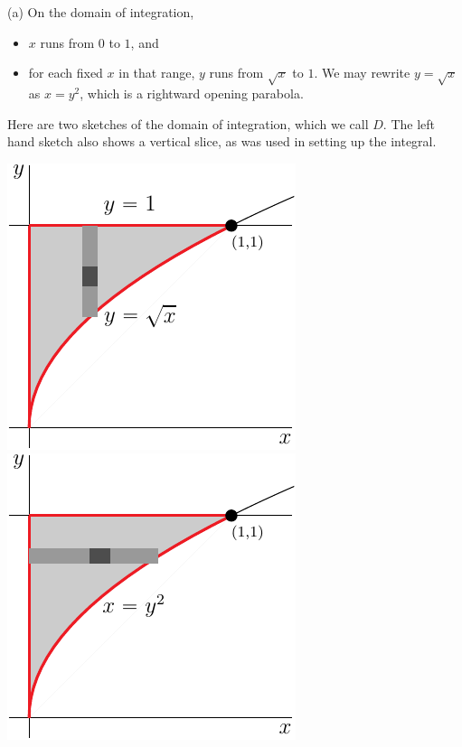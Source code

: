 \begin{solution}
(a)
On the domain of integration,
\begin{itemize}
\item
$x$ runs from $0$ to $1$, and
\item
for each fixed $x$ in that range,
$y$ runs from $\sqrt{x}$ to $1$.
We may rewrite $y=\sqrt{x}$ as $x=y^2$, which is a rightward opening
parabola.
\end{itemize}
Here are two sketches of the domain of integration, which we call $D$.
The left hand sketch also shows a vertical slice, as was used in setting up 
the integral.
\begin{center}
     \includegraphics{fig/OE10A_6v.pdf}\qquad
     \includegraphics{fig/OE10A_6h.pdf}
\end{center}


\end{solution}
